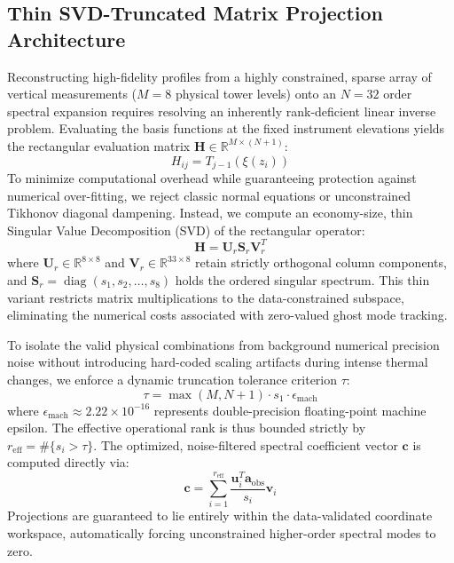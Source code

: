 \subsection{Thin SVD-Truncated Matrix Projection Architecture}
\label{sec:methods:svd}

Reconstructing high-fidelity profiles from a highly constrained, sparse array of vertical measurements ($M = 8$ physical tower levels) onto an $N=32$ order spectral expansion requires resolving an inherently rank-deficient linear inverse problem. Evaluating the basis functions at the fixed instrument elevations yields the rectangular evaluation matrix $\mathbf{H} \in \mathbb{R}^{M \times (N+1)}$:
\begin{equation}
H_{ij} = T_{j-1}(\xi(z_i))
\label{eq:h_matrix_def}
\end{equation}
To minimize computational overhead while guaranteeing protection against numerical over-fitting, we reject classic normal equations or unconstrained Tikhonov diagonal dampening. Instead, we compute an economy-size, thin Singular Value Decomposition (SVD) of the rectangular operator:
\begin{equation}
\mathbf{H} = \mathbf{U}_r \mathbf{S}_r \mathbf{V}_r^T
\label{eq:thin_svd}
\end{equation}
where $\mathbf{U}_r \in \mathbb{R}^{8 \times 8}$ and $\mathbf{V}_r \in \mathbb{R}^{33 \times 8}$ retain strictly orthogonal column components, and $\mathbf{S}_r = \operatorname{diag}(s_1, s_2, \ldots, s_8)$ holds the ordered singular spectrum. This thin variant restricts matrix multiplications to the data-constrained subspace, eliminating the numerical costs associated with zero-valued ghost mode tracking.

To isolate the valid physical combinations from background numerical precision noise without introducing hard-coded scaling artifacts during intense thermal changes, we enforce a dynamic truncation tolerance criterion $\tau$:
\begin{equation}
\tau = \max\left(M, N+1\right) \cdot s_1 \cdot \epsilon_{\mathrm{mach}}
\label{eq:dynamic_tolerance}
\end{equation}
where $\epsilon_{\mathrm{mach}} \approx 2.22 \times 10^{-16}$ represents double-precision floating-point machine epsilon. The effective operational rank is thus bounded strictly by $r_{\mathrm{eff}} = \#\{s_i > \tau\}$. The optimized, noise-filtered spectral coefficient vector $\mathbf{c}$ is computed directly via:
\begin{equation}
\mathbf{c} = \sum_{i=1}^{r_{\mathrm{eff}}} \frac{\mathbf{u}_i^T \mathbf{a}_{\mathrm{obs}}}{s_i} \mathbf{v}_i
\label{eq:svd_reconstruction}
\end{equation}
Projections are guaranteed to lie entirely within the data-validated coordinate workspace, automatically forcing unconstrained higher-order spectral modes to zero.

